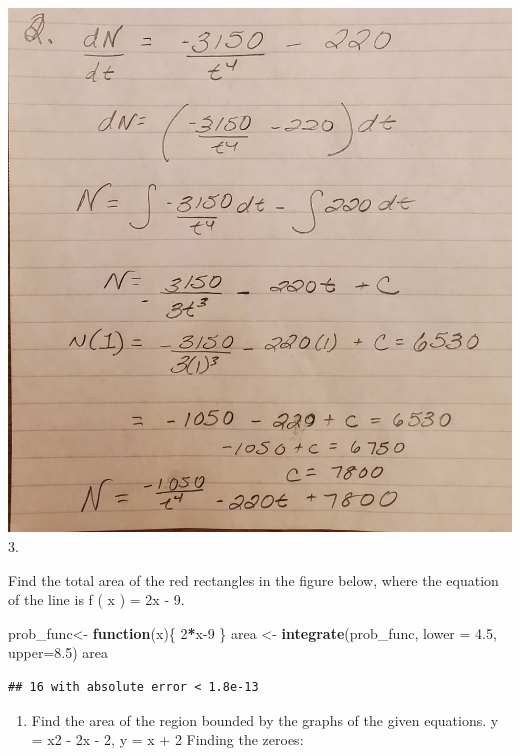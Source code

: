 \documentclass[
]{article}
\newenvironment{Shaded}{\begin{snugshade}}{\end{snugshade}}
\newcommand{\ControlFlowTok}[1]{\textcolor[rgb]{0.13,0.29,0.53}{\textbf{#1}}}
\newcommand{\DataTypeTok}[1]{\textcolor[rgb]{0.13,0.29,0.53}{#1}}
\newcommand{\DecValTok}[1]{\textcolor[rgb]{0.00,0.00,0.81}{#1}}
\newcommand{\FloatTok}[1]{\textcolor[rgb]{0.00,0.00,0.81}{#1}}
\newcommand{\KeywordTok}[1]{\textcolor[rgb]{0.13,0.29,0.53}{\textbf{#1}}}
\newcommand{\NormalTok}[1]{#1}
\newcommand{\OperatorTok}[1]{\textcolor[rgb]{0.81,0.36,0.00}{\textbf{#1}}}
\newcommand{\StringTok}[1]{\textcolor[rgb]{0.31,0.60,0.02}{#1}}
\providecommand{\tightlist}{%
  \setlength{\itemsep}{0pt}\setlength{\parskip}{0pt}}
\begin{document}
\includegraphics[width=26.1in]{13_2} 3.

Find the total area of the red rectangles in the figure below, where the
equation of the line is f ( x ) = 2x - 9.

\begin{Shaded}
\begin{Highlighting}[]
\NormalTok{prob_func<-}\StringTok{ }\ControlFlowTok{function}\NormalTok{(x)\{}
    \DecValTok{2}\OperatorTok{*}\NormalTok{x}\DecValTok{-9}
\NormalTok{\}}
\NormalTok{area <-}\StringTok{ }\KeywordTok{integrate}\NormalTok{(prob_func, }\DataTypeTok{lower =} \FloatTok{4.5}\NormalTok{, }\DataTypeTok{upper=}\FloatTok{8.5}\NormalTok{)}
\NormalTok{area}
\end{Highlighting}
\end{Shaded}

\begin{verbatim}
## 16 with absolute error < 1.8e-13
\end{verbatim}

\begin{enumerate}
\def\labelenumi{\arabic{enumi}.}
\setcounter{enumi}{3}
\tightlist
\item
  Find the area of the region bounded by the graphs of the given
  equations. y = x2 - 2x - 2, y = x + 2 Finding the zeroes:
\end{enumerate}
\end{document}
